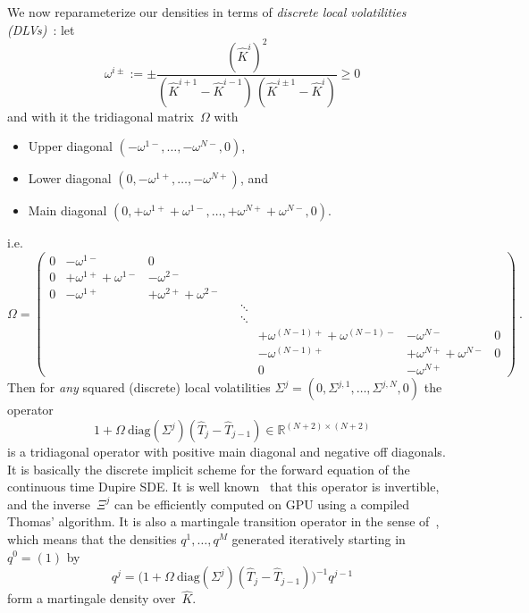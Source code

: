 \documentclass[11pt,a4paper]{article}
\newcommand{\R}{\mathbb{R}}
\DeclareRobustCommand{\eqx}{\begin{equation}}                                         %
\DeclareRobustCommand{\eqend}{\end{equation}}                                         %
\begin{document}
We now reparameterize our densities in terms of \emph{discrete local volatilities (DLVs)}~\citep{DLV}: let
$$     
    \omega^{i\pm} := \pm    \frac{ (\hat K^{i})^2 }{ (\hat K^{i+1} - \hat K^{i-1})\,(\hat K^{i\pm 1} - \hat K^{i}) }  \geq 0
$$
and with it the tridiagonal matrix~$\Omega$ with 
\begin{itemize}
    \item Upper diagonal $( -\omega^{1-}, \ldots, -\omega^{N-}, 0 )$,
    \item Lower diagonal $( 0, -\omega^{1+}, \ldots, -\omega^{N+} )$, and
    \item Main diagonal $( 0, +\omega^{1+}+\omega^{1-}, \ldots, +\omega^{N+}+\omega^{N-}, 0 )$.
\end{itemize}
i.e.
\eqx
    \Omega = \left(
                \begin{array}{cccccccccc}
                0 & -\omega^{1-} & 0 \\
                0 & +\omega^{1+}+\omega^{1-} & -\omega^{2-} \\
                0 & -\omega^{1+} & +\omega^{2+}+\omega^{2-} \\
                & & & &  \ddots\\
                & & & &  \ddots\\
                & & & & & +\omega^{(N-1)+}+\omega^{(N-1)-} & -\omega^{N-} & 0 \\
                & & & & & -\omega^{(N-1)+} & +\omega^{N+}+\omega^{N-} & 0 \\
                & & & & & 0 & -\omega^{N+} & 
                \end{array} 
    \right) \ .
\eqend
Then for \emph{any} squared (discrete) local volatilities $\Sigma^j = ( 0, \Sigma^{j,1}, \ldots, \Sigma^{j,N}, 0 )$
the operator
\eqx
            1 + \Omega\ \mathrm{diag}(\Sigma^j) (\hat T_j - \hat T_{j-1}) \in \R^{(N+2)\times(N+2)}
\eqend
is a tridiagonal operator with positive main diagonal and negative off diagonals. 
It is basically the discrete implicit scheme for the forward equation of the continuous time Dupire SDE.
It is well known~\citep{DLV}
that this operator is invertible, and the inverse~$\Xi^j$ can be efficiently computed on GPU using a compiled
Thomas' algorithm. It is also
a martingale transition operator in
 the sense of~\citet{DLV}, which means that the densities $q^1,\ldots,q^M$ generated
 iteratively starting in $q^0=(1)$ by
\begin{equation}\label{eq:densitytrans}
    q^j = \Big( 1+  \Omega\ \mathrm{diag}(\Sigma^j) (\hat T_j - \hat T_{j-1}) \Big)^{-1} q^{j-1} 
\end{equation}
form a martingale density over~$\hat K$.
\end{document}
